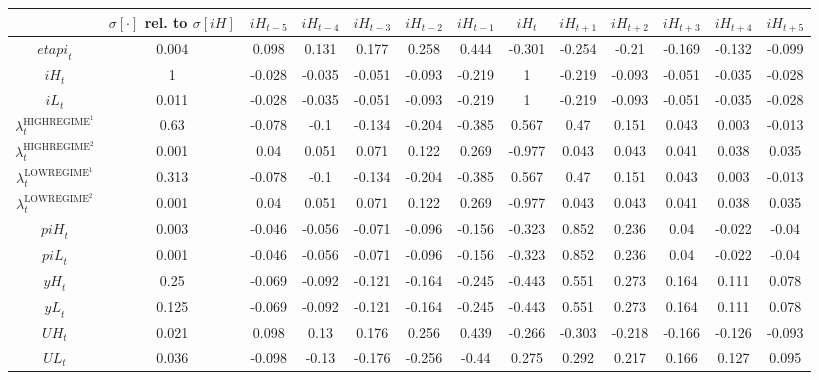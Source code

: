 \begin{tabular}{c|c|c|c|c|c|c|c|c|c|c|c|c|}
  & $\sigma[\cdot]$ rel. to $\sigma[{i\!H}]$ & ${i\!H}_{t-5}$ & ${i\!H}_{t-4}$ & ${i\!H}_{t-3}$ & ${i\!H}_{t-2}$ & ${i\!H}_{t-1}$ & ${i\!H}_{t}$ & ${i\!H}_{t+1}$ & ${i\!H}_{t+2}$ & ${i\!H}_{t+3}$ & ${i\!H}_{t+4}$ & ${i\!H}_{t+5}$\\
\hline
${e\!t\!a\!p\!i}_{t}$ & 0.004 & 0.098 & 0.131 & 0.177 & 0.258 & 0.444 & -0.301 & -0.254 & -0.21 & -0.169 & -0.132 & -0.099 \\
${i\!H}_{t}$ & 1 & -0.028 & -0.035 & -0.051 & -0.093 & -0.219 & 1 & -0.219 & -0.093 & -0.051 & -0.035 & -0.028 \\
${i\!L}_{t}$ & 0.011 & -0.028 & -0.035 & -0.051 & -0.093 & -0.219 & 1 & -0.219 & -0.093 & -0.051 & -0.035 & -0.028 \\
$\lambda^{\mathrm{HIGHREGIME}^{\mathrm{1}}}_{t}$ & 0.63 & -0.078 & -0.1 & -0.134 & -0.204 & -0.385 & 0.567 & 0.47 & 0.151 & 0.043 & 0.003 & -0.013 \\
$\lambda^{\mathrm{HIGHREGIME}^{\mathrm{2}}}_{t}$ & 0.001 & 0.04 & 0.051 & 0.071 & 0.122 & 0.269 & -0.977 & 0.043 & 0.043 & 0.041 & 0.038 & 0.035 \\
$\lambda^{\mathrm{LOWREGIME}^{\mathrm{1}}}_{t}$ & 0.313 & -0.078 & -0.1 & -0.134 & -0.204 & -0.385 & 0.567 & 0.47 & 0.151 & 0.043 & 0.003 & -0.013 \\
$\lambda^{\mathrm{LOWREGIME}^{\mathrm{2}}}_{t}$ & 0.001 & 0.04 & 0.051 & 0.071 & 0.122 & 0.269 & -0.977 & 0.043 & 0.043 & 0.041 & 0.038 & 0.035 \\
${p\!i\!H}_{t}$ & 0.003 & -0.046 & -0.056 & -0.071 & -0.096 & -0.156 & -0.323 & 0.852 & 0.236 & 0.04 & -0.022 & -0.04 \\
${p\!i\!L}_{t}$ & 0.001 & -0.046 & -0.056 & -0.071 & -0.096 & -0.156 & -0.323 & 0.852 & 0.236 & 0.04 & -0.022 & -0.04 \\
${y\!H}_{t}$ & 0.25 & -0.069 & -0.092 & -0.121 & -0.164 & -0.245 & -0.443 & 0.551 & 0.273 & 0.164 & 0.111 & 0.078 \\
${y\!L}_{t}$ & 0.125 & -0.069 & -0.092 & -0.121 & -0.164 & -0.245 & -0.443 & 0.551 & 0.273 & 0.164 & 0.111 & 0.078 \\
${U\!H}_{t}$ & 0.021 & 0.098 & 0.13 & 0.176 & 0.256 & 0.439 & -0.266 & -0.303 & -0.218 & -0.166 & -0.126 & -0.093 \\
${U\!L}_{t}$ & 0.036 & -0.098 & -0.13 & -0.176 & -0.256 & -0.44 & 0.275 & 0.292 & 0.217 & 0.166 & 0.127 & 0.095 \\
\hline
\end{tabular}


